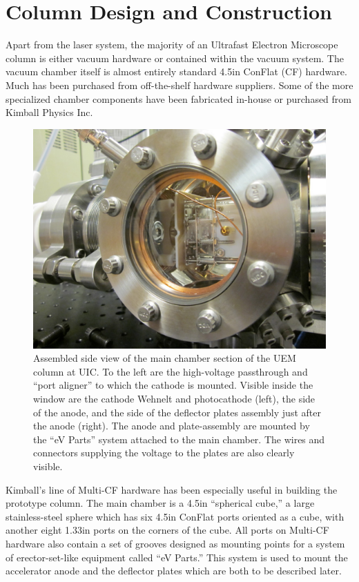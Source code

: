 
\section{Column Design and Construction}

Apart from the laser system, the majority of an Ultrafast Electron Microscope column is either vacuum hardware or contained within the vacuum system.
The vacuum chamber itself is almost entirely standard 4.5in ConFlat (CF) hardware.
Much has been purchased from off-the-shelf hardware suppliers.
Some of the more specialized chamber components have been fabricated in-house or purchased from Kimball Physics Inc.

\begin{figure}
  \centering
  \includegraphics{chamber.jpg}
  \caption[Side view of main chamber]{
    Assembled side view of the main chamber section of the UEM column at UIC.
    To the left are the high-voltage passthrough and ``port aligner'' to which the cathode is mounted.
    Visible inside the window are the cathode Wehnelt and photocathode (left), the side of the anode, and the side of the deflector plates assembly just after the anode (right).
    The anode and plate-assembly are mounted by the ``eV Parts'' system attached to the main chamber.
    The wires and connectors supplying the voltage to the plates are also clearly visible.
  }
  \label{fig:chamber-pic}
\end{figure}

Kimball's line of Multi-CF hardware has been especially useful in building the prototype column.
The main chamber is a 4.5in ``spherical cube,'' a large stainless-steel sphere which has six 4.5in ConFlat ports oriented as a cube, with another eight 1.33in ports on the corners of the cube.
All ports on Multi-CF hardware also contain a set of grooves designed as mounting points for a system of erector-set-like equipment called ``eV Parts.''
This system is used to mount the accelerator anode and the deflector plates which are both to be described later.


